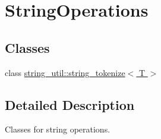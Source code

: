 \hypertarget{group___string_operations}{\section{String\-Operations}
\label{group___string_operations}
}
\subsection*{Classes}
\begin{DoxyCompactItemize}
\item 
class \hyperlink{classstring__util_1_1string__tokenize}{string\-\_\-util\-::string\-\_\-tokenize$<$ T $>$}
\end{DoxyCompactItemize}


\subsection{Detailed Description}
Classes for string operations. 